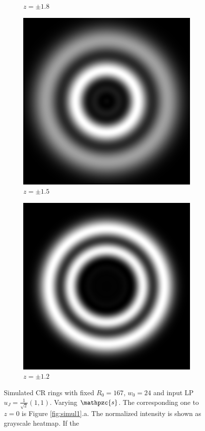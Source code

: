 \documentclass[11pt, a4paper, twoside]{article} %
\newcommand{\z}{\mathpzc{s}}
\begin{document}
\begin{figure}[h!]
\begin{subfigure}[b]{0.245\linewidth}
    \caption{$z=\pm1.8$}
     \end{subfigure}
 \begin{subfigure}[b]{0.245\linewidth}
     \includegraphics[width=\linewidth]{simul5999.png}
    \caption{$z=\pm1.5$}
     \end{subfigure}
  \begin{subfigure}[b]{0.245\linewidth}
     \includegraphics[width=\linewidth]{simul59990.png}
    \caption{$z=\pm1.2$}
     \end{subfigure}
    \caption{Simulated CR rings with fixed $R_0=167$, $w_0=24$ and input LP $\hat{u}_J=\frac{1}{\sqrt{2}}(1,1)$. Varying $\z$. The corresponding one to $z=0$ is Figure \ref{fig:simul1}.a. The normalized intensity is shown as grayscale heatmap. If the }
            \label{fig:simul5}
\end{figure}
\end{document}
